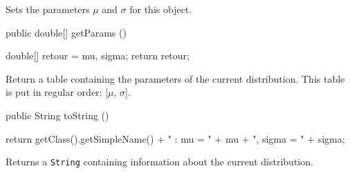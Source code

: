 \begin{tabb} Sets the parameters $\mu$ and $\sigma$ for this object.
\end{tabb}
\begin{htmlonly}
\end{htmlonly}
\begin{code}

   public double[] getParams ()\begin{hide} {
      double[] retour = {mu, sigma};
      return retour;
   }\end{hide}
\end{code}
\begin{tabb}
   Return a table containing the parameters of the current distribution.
   This table is put in regular order: [$\mu$, $\sigma$].
\end{tabb}
\begin{htmlonly}
\end{htmlonly}
\begin{code}

   public String toString ()\begin{hide} {
      return getClass().getSimpleName() + " : mu = " + mu + ", sigma = " + sigma;
   }\end{hide}
\end{code}
\begin{tabb}
   Returns a \texttt{String} containing information about the current distribution.
\end{tabb}
\begin{htmlonly}
\end{htmlonly}
\begin{code}\begin{hide}
}\end{hide}
\end{code}
